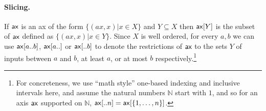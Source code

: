 \documentclass{article}
\begin{document}
\paragraph{Slicing.} If $\mathsf{ax}$ is an ax of the form $\{ (ax,x) | x \in X \}$ and $Y \subseteq X$ then $\mathsf{ax}[Y]$ is the subset of $\mathsf{ax}$ defined as $\{ (ax,x) | x\in Y \}$. Since $X$ is well ordered, for every $a,b$ we can use $\mathsf{ax}[a..b]$, $\mathsf{ax}[a..]$ or $\mathsf{ax}[..b]$ to denote the restrictions of $\mathsf{ax}$ to the sets $Y$ of inputs between $a$ and $b$, at least $a$, or at most $b$ respectively.\footnote{For concreteness, we use ``math style'' one-based indexing and inclusive intervals here, and assume the natural numbers $\mathbb{N}$ start with $1$, and so for an axis $\mathsf{ax}$ supported on $\mathbb{N}$,  $\mathsf{ax}[..n] = \mathsf{ax}[\{1,\ldots,n\}]$.}










\iffalse %
\section*{References}
\fi



\end{document}
